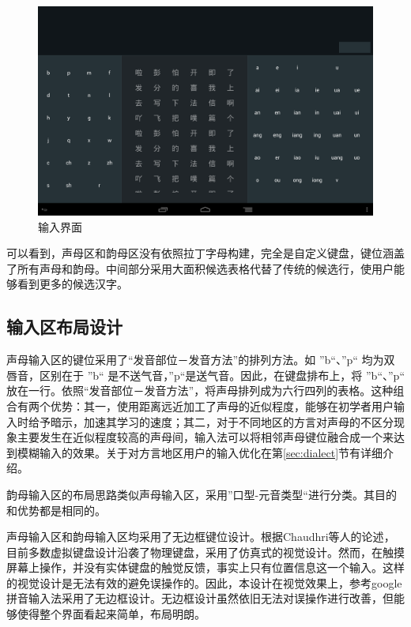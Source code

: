   \begin{figure}[h]
  \noindent\includegraphics[width=150mm]{img/layout1_background}
  \caption{输入界面}
  \label{fig:layout1_background}
  \end{figure}

  可以看到，声母区和韵母区没有依照拉丁字母构建，完全是自定义键盘，键位涵盖了所有声母和韵母。中间部分采用大面积候选表格代替了传统的候选行，使用户能够看到更多的候选汉字。

  \subsection{输入区布局设计}

  声母输入区的键位采用了“发音部位－发音方法”的排列方法。如 ”b“、”p“ 均为双唇音，区别在于 ”b“ 是不送气音，”p“是送气音。因此，在键盘排布上，将 ”b“、”p“ 放在一行。依照“发音部位－发音方法”，将声母排列成为六行四列的表格。这种组合有两个优势：其一，使用距离远近加工了声母的近似程度，能够在初学者用户输入时给予暗示，加速其学习的速度；其二，对于不同地区的方言对声母的不区分现象主要发生在近似程度较高的声母间，输入法可以将相邻声母键位融合成一个来达到模糊输入的效果。关于对方言地区用户的输入优化在第\ref{sec:dialect}节有详细介绍。

  韵母输入区的布局思路类似声母输入区，采用”口型-元音类型“进行分类。其目的和优势都是相同的。

  声母输入区和韵母输入区均采用了无边框键位设计。根据Chaudhri等人的论述\supercite{chaudhri}，目前多数虚拟键盘设计沿袭了物理键盘，采用了仿真式的视觉设计。然而，在触摸屏幕上操作，并没有实体键盘的触觉反馈，事实上只有位置信息这一个输入。这样的视觉设计是无法有效的避免误操作的。因此，本设计在视觉效果上，参考google拼音输入法采用了无边框设计。无边框设计虽然依旧无法对误操作进行改善，但能够使得整个界面看起来简单，布局明朗。


